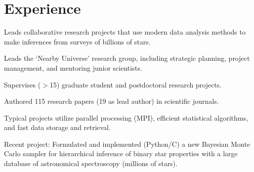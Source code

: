\documentclass[letterpaper,12pt]{deedy-resume}
\begin{document}
\begin{minipage}[t]{0.64\textwidth} %


\section{Experience}


\vspace{1.5\topsep} %
\begin{tightitemize}
    \item Leads collaborative research projects that use modern data analysis methods to make inferences from surveys of billions of stars.
    \item Leads the `Nearby Universe' research group, including strategic planning, project management, and mentoring junior scientists.
    \item Supervises ($>$15) graduate student and postdoctoral research projects.
    \item Authored 115 research papers (19 as lead author) in scientific journals.
    \item Typical projects utilize parallel processing (MPI), efficient statistical algorithms, and fast data storage and retrieval.
    \item Recent project: Formulated and implemented (Python/C) a new Bayesian Monte Carlo sampler for hierarchical inference of binary star properties with a large database of astronomical spectroscopy (millions of stars).
\end{tightitemize}

\sectionspace %



\end{minipage}
\end{document}
